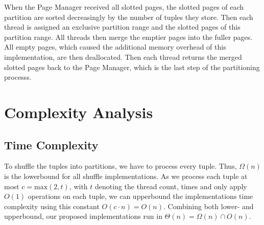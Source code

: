 When the Page Manager received all slotted pages, the slotted pages of each partition are sorted decreasingly by the number of tuples they store.
Then each thread is assigned an exclusive partition range and the slotted pages of this partition range.
All threads then merge the emptier pages into the fuller pages.
All empty pages, which caused the additional memory overhead of this implementation, are then deallocated.
Then each thread returns the merged slotted pages back to the Page Manager, which is the last step of the partitioning processs.

\section{Complexity Analysis}
\subsection{Time Complexity}
To shuffle the tuples into partitions, we have to process every tuple.
Thus, $\Omega(n)$ is the lowerbound for all shuffle implementations.
As we process each tuple at most $c = \textrm{max}(2, t)$, with $t$ denoting the thread count, times and only apply $O(1)$ operations on each tuple, we can upperbound the implementations time complexity using this constant $O(c\cdot n) = O(n)$.
Combining both lower- and upperbound, our proposed implementations run in $\Theta(n) = \Omega(n) \cap O(n) $.
